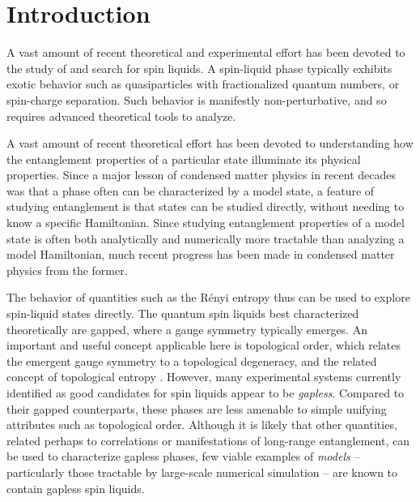 \documentclass[11pt]{iopart}
\begin{document}
\hypersetup{linkcolor=red}

\section[Introduction]{Introduction}

\label{sec:introduction}



A vast amount of recent theoretical and experimental effort has been devoted to the study of and search for spin liquids. A spin-liquid phase typically exhibits exotic behavior such as quasiparticles 
with fractionalized quantum numbers, or spin-charge separation. Such behavior is manifestly non-perturbative, and so requires advanced theoretical tools to analyze. 

A vast amount of recent theoretical effort has been devoted to understanding how the entanglement properties of a particular state illuminate its physical properties. Since a major lesson of condensed matter physics in recent decades was that a phase often can be characterized by a model state, a feature of studying entanglement is that states can be studied directly, without needing to know a specific Hamiltonian. 
Since studying entanglement properties of a model state is often both analytically and numerically more tractable than analyzing a model Hamiltonian, much recent progress has been made in condensed matter physics from the former.




The behavior of quantities such as the R\'enyi entropy thus can be used to explore spin-liquid states directly. The quantum spin liquids best characterized theoretically are { gapped}, where a gauge symmetry typically emerges.
An important and useful concept applicable here is topological order, which relates the emergent gauge symmetry to a topological degeneracy, and the related concept of { topological entropy} \cite{HIZ,KP,LW}. 
However, many experimental systems currently identified as good candidates for spin liquids appear to be {\it gapless}.  Compared to their gapped counterparts, these phases are less amenable to simple unifying attributes such as topological order.  Although it is likely that other quantities, related perhaps to correlations or manifestations of long-range entanglement, can be used to characterize gapless phases, few viable examples of {\it models} -- particularly those tractable by large-scale numerical simulation -- are known to contain gapless spin liquids.
\end{document}
